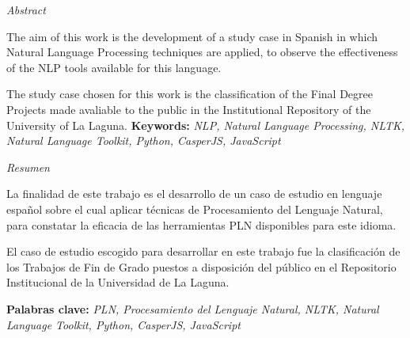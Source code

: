 
\bigskip
\begin{center}
\huge{\textit{Abstract}} \par
\end{center}


The aim of this work is the development of a study case in Spanish in which Natural Language Processing techniques are applied, to observe the effectiveness of the NLP tools available for this language.

The study case chosen for this work is the classification of the Final Degree Projects made avaliable to the public in the Institutional Repository of the University of La Laguna.
\vskip 40pt
\textbf{Keywords:} \textit{NLP, Natural Language Processing, NLTK, Natural Language Toolkit, Python, CasperJS, JavaScript}

\clearpage
{}
\begin{center}
\huge{\textit{Resumen}} \par
\end{center}


La finalidad de este trabajo es el desarrollo de un caso de estudio en lenguaje español sobre el cual aplicar técnicas de Procesamiento del Lenguaje Natural, para constatar la eficacia de las herramientas PLN disponibles para este idioma.

El caso de estudio escogido para desarrollar en este trabajo fue la clasificación de los Trabajos de Fin de Grado puestos a disposición del público en el Repositorio Institucional de la Universidad de La Laguna.

\vskip 40pt
\textbf{Palabras clave:} \textit{PLN, Procesamiento del Lenguaje Natural, NLTK, Natural Language Toolkit, Python, CasperJS, JavaScript}

\clearpage  %

